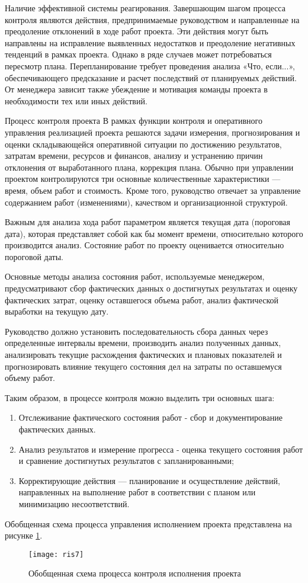 Наличие эффективной системы реагирования.
Завершающим шагом процесса контроля являются действия, предпринимаемые руководством и направленные на преодоление отклонений в ходе работ проекта.
Эти действия могут быть направлены на исправление выявленных недостатков и преодоление негативных тенденций в рамках проекта.
Однако в ряде случаев может потребоваться пересмотр плана.
Перепланирование требует проведения анализа «Что, если...», обеспечивающего предсказание и расчет последствий от планируемых действий.
От менеджера зависит также убеждение и мотивация команды проекта в необходимости тех или иных действий.

Процесс контроля проекта
В рамках функции контроля и оперативного управления реализацией проекта решаются задачи измерения, прогнозирования и оценки складывающейся оперативной ситуации по достижению результатов, затратам времени, ресурсов и финансов, анализу и устранению причин отклонения от выработанного плана, коррекция плана.
Обычно при управлении проектом контролируются три основные количественные характеристики --- время, объем работ и стоимость.
Кроме того, руководство отвечает за управление содержанием работ (изменениями), качеством и организационной структурой.

Важным для анализа хода работ параметром является текущая дата (пороговая дата), которая представляет собой как бы момент времени, относительно которого производится анализ.
Состояние работ по проекту оценивается относительно пороговой даты.

Основные методы анализа состояния работ, используемые менеджером, предусматривают сбор фактических данных о достигнутых результатах и оценку фактических затрат, оценку оставшегося объема работ, анализ фактической выработки на текущую дату.

Руководство должно установить последовательность сбора данных через определенные интервалы времени, производить анализ полученных данных, анализировать текущие расхождения фактических и плановых показателей и прогнозировать влияние текущего состояния дел на затраты по оставшемуся объему работ.

Таким образом, в процессе контроля можно выделить три основных шага:

\begin{enumerate}
	\item Отслеживание фактического состояния работ - сбор и документирование фактических данных.
	\item Анализ результатов и измерение прогресса - оценка текущего состояния работ и сравнение достигнутых результатов с запланированными;
	\item Корректирующие действия --- планирование и осуществление действий, направленных на выполнение работ в соответствии с планом или минимизацию несоответствий.
\end{enumerate}

Обобщенная схема процесса управления исполнением проекта представлена на рисунке \ref{fig:ris7}.
\begin{figure}[!h]
	\centering
	\texttt{[image: ris7]}
	\caption{Обобщенная схема процесса контроля исполнения проекта}
	\label{fig:ris7}
\end{figure}
